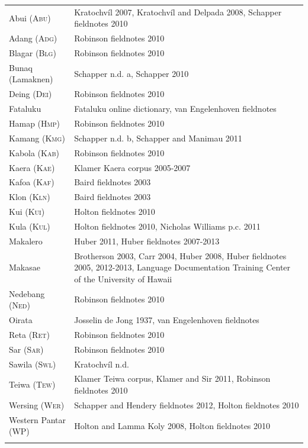  
\begin{tabular}{lp{7.5cm}}
Abui (\textsc{Abu}) & Kratochv\'il 2007, Kratochv\'il and Delpada 2008, Schapper fieldnotes 2010\\
Adang (\textsc{Adg}) & Robinson fieldnotes 2010\\
Blagar (\textsc{Blg}) & Robinson fieldnotes 2010\\
Bunaq (Lamaknen) & Schapper n.d. a, Schapper 2010\\
Deing (\textsc{Dei}) & Robinson fieldnotes 2010\\
Fataluku & Fataluku online dictionary\footnotemark{}, van Engelenhoven fieldnotes\\
Hamap (H\textsc{mp}) & Robinson fieldnotes 2010\\
Kamang (\textsc{Kmg}) & Schapper n.d. b, Schapper and Manimau 2011\\
Kabola (K\textsc{ab}) & Robinson fieldnotes 2010\\
Kaera (K\textsc{ae}) & Klamer Kaera corpus 2005-2007\\
Kafoa (\textsc{Kaf}) & Baird fieldnotes 2003\\
Klon (\textsc{Kln}) & Baird fieldnotes 2003\\
Kui (\textsc{Kui}) & Holton fieldnotes 2010\\
Kula (\textsc{Kul}) & Holton fieldnotes 2010, Nicholas Williams p.c. 2011\\
Makalero & Huber 2011, Huber fieldnotes 2007-2013\\
Makasae & Brotherson 2003, Carr 2004, Huber 2008, Huber fieldnotes 2005, 2012-2013, Language Documentation Training Center of the University of Hawaii\footnotemark{}\\
Nedebang (N\textsc{ed}) & Robinson fieldnotes 2010\\
Oirata & Josselin de Jong 1937, van Engelenhoven fieldnotes\\
Reta (\textsc{Ret}) & Robinson fieldnotes 2010\\
Sar (S\textsc{ar}) & Robinson fieldnotes 2010\\
Sawila (S\textsc{wl}) & Kratochv\'il n.d.\\
Teiwa (\textsc{Tew}) & Klamer Teiwa corpus, Klamer and Sir 2011, Robinson fieldnotes 2010\\
Wersing (\textsc{Wer}) & Schapper and Hendery fieldnotes 2012, Holton fieldnotes 2010\\
Western Pantar (WP) & Holton and Lamma Koly 2008, Holton fieldnotes 2010\\
\mybottomrule
\end{tabular}


